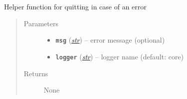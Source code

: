 \documentclass[letterpaper,10pt,english]{sphinxmanual}
\begin{document}

\begin{fulllineitems}
\label{util/misc:escape.util.misc.quit_with_error}
Helper function for quitting in case of an error
\begin{quote}\begin{description}
\item[{Parameters}] \leavevmode\begin{itemize}
\item {} 
\textbf{\texttt{msg}} (\href{https://docs.python.org/2.7/library/functions.html\#str}{\emph{str}}) -- error message (optional)

\item {} 
\textbf{\texttt{logger}} (\href{https://docs.python.org/2.7/library/functions.html\#str}{\emph{str}}) -- logger name (default: core)

\end{itemize}

\item[{Returns}] \leavevmode
None

\end{description}\end{quote}

\end{fulllineitems}

\end{document}
